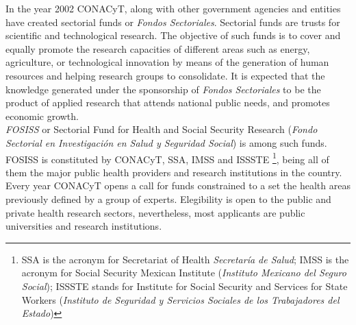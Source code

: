 In the year 2002 CONACyT, along with other government agencies and entities have created sectorial funds or \emph{Fondos Sectoriales}. Sectorial funds are trusts for scientific and technological research. The objective of such funds is to cover and equally promote the research capacities of different areas such as energy, agriculture, or technological innovation by means of the generation of human resources and helping research groups to consolidate. It is expected that the knowledge generated under the sponsorship of \emph{Fondos Sectoriales} to be the product of applied research that attends national public needs, and promotes economic growth.\\

\emph{FOSISS} or Sectorial Fund for Health and Social Security Research (\emph{Fondo Sectorial en Investigaci\'on en Salud y Seguridad Social}) is among such funds. FOSISS is constituted by CONACyT, SSA, IMSS and ISSSTE \footnote{SSA is the acronym for Secretariat of Health \emph{Secretar\'ia de Salud}; IMSS is the acronym for Social Security Mexican Institute (\emph{Instituto Mexicano del Seguro Social}); ISSSTE stands for Institute for Social Security and Services for State Workers (\emph{Instituto de Seguridad y Servicios Sociales de los Trabajadores del Estado})}, being all of them the major public health providers and research institutions in the country. Every year CONACyT opens a call for funds constrained to a set the health areas previously defined by a group of experts. Elegibility is open to the public and private health research sectors, nevertheless, most applicants are public universities and research institutions. 



